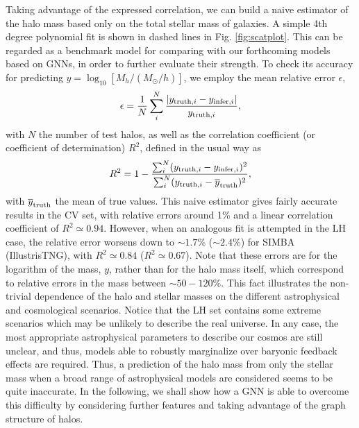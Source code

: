 \documentclass[twocolumn]{aastex631}
\begin{document}
Taking advantage of the expressed correlation, we can build a naive estimator of the halo mass based only on the total stellar mass of galaxies. A simple 4th degree polynomial fit is shown in dashed lines in Fig. \ref{fig:scatplot}. This can be regarded as a benchmark model for comparing with our forthcoming models based on GNNs, in order to further evaluate their strength. To check its accuracy for predicting $y=\log_{10}\left[M_h/(M_\odot/h)\right]$, we employ the mean relative error $\epsilon$, 
\begin{equation}
    \epsilon = \frac{1}{N} \sum_i^N \frac{|y_{{\rm truth}, i} - y_{{\rm infer}, i}|}{y_{{\rm truth}, i}},
\end{equation}
with $N$ the number of test halos, as well as the correlation coefficient (or coefficient of determination) $R^2$, defined in the usual way as
\begin{equation}
    R^2 = 1 - \frac{\sum_i^N (y_{{\rm truth}, i} - y_{{\rm infer}, i})^2}{\sum_i^N (y_{{\rm truth}, i} - \overline{y}_{{\rm truth}})^2},
\end{equation}
with $\overline{y}_{{\rm truth}}$ the mean of true values. This naive estimator gives fairly accurate results in the CV set, with relative errors around 1\% and a linear correlation coefficient of $R^2\simeq 0.94$. However, when an analogous fit is attempted in the LH case, the relative error worsens down to $\sim 1.7$\% ($\sim 2.4$\%) for SIMBA (IllustrisTNG), with $R^2\simeq 0.84$ ($R^2\simeq 0.67$). Note that these errors are for the logarithm of the mass, $y$, rather than for the halo mass itself, which correspond to relative errors in the mass between $\sim 50-120 \%$. This fact illustrates the non-trivial dependence of the halo and stellar masses on the different astrophysical and cosmological scenarios. Notice that the LH set contains some extreme scenarios which may be unlikely to describe the real universe. In any case, the most appropriate astrophysical parameters to describe our cosmos are still unclear, and thus, models able to robustly marginalize over baryonic feedback effects are required. Thus, a prediction of the halo mass from only the stellar mass when a broad range of astrophysical models are considered seems to be quite inaccurate. In the following, we shall show how a GNN is able to overcome this difficulty by considering further features and taking advantage of the graph structure of halos. 
\end{document}
